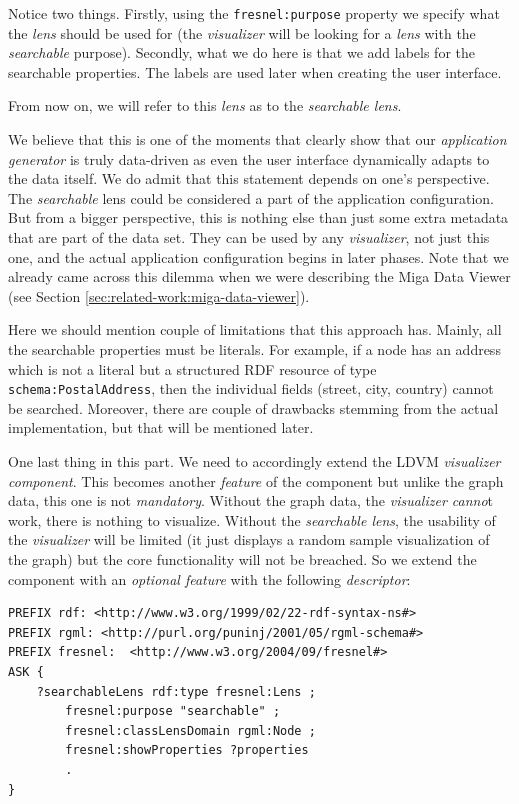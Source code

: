 Notice two things. Firstly, using the \texttt{fresnel:purpose} property we specify what the \emph{lens} should be used for (the \emph{visualizer} will be looking for a \emph{lens} with the \emph{searchable} purpose). Secondly, what we do here is that we add labels for the searchable properties. The labels are used later when creating the user interface.

From now on, we will refer to this \emph{lens} as to the \emph{searchable lens}.

We believe that this is one of the moments that clearly show that our \emph{application generator} is truly data-driven as even the user interface dynamically adapts to the data itself. We do admit that this statement depends on one’s perspective. The \emph{searchable} lens could be considered a part of the application configuration. But from a bigger perspective, this is nothing else than just some extra metadata that are part of the data set. They can be used by any \emph{visualizer}, not just this one, and the actual application configuration begins in later phases. Note that we already came across this dilemma when we were describing the Miga Data Viewer (see Section \ref{sec:related-work:miga-data-viewer}).

Here we should mention couple of limitations that this approach has. Mainly, all the searchable properties must be literals. For example, if a node has an address which is not a literal but a structured RDF resource of type \texttt{schema:PostalAddress}, then the individual fields (street, city, country) cannot be searched. Moreover, there are couple of drawbacks stemming from the actual implementation, but that will be mentioned later.

One last thing in this part. We need to accordingly extend the LDVM \emph{visualizer component}. This becomes another \emph{feature} of the component but unlike the graph data, this one is not \emph{mandatory}. Without the graph data, the \emph{visualizer canno}t work, there is nothing to visualize. Without the \emph{searchable lens}, the usability of the \emph{visualizer} will be limited (it just displays a random sample visualization of the graph) but the core functionality will not be breached. So we extend the component with an \emph{optional feature} with the following \emph{descriptor}:

\begin{verbatim}
PREFIX rdf: <http://www.w3.org/1999/02/22-rdf-syntax-ns#>
PREFIX rgml: <http://purl.org/puninj/2001/05/rgml-schema#>
PREFIX fresnel:  <http://www.w3.org/2004/09/fresnel#>
ASK {
    ?searchableLens rdf:type fresnel:Lens ;
        fresnel:purpose "searchable" ;
        fresnel:classLensDomain rgml:Node ;
        fresnel:showProperties ?properties
        .
}
\end{verbatim}

